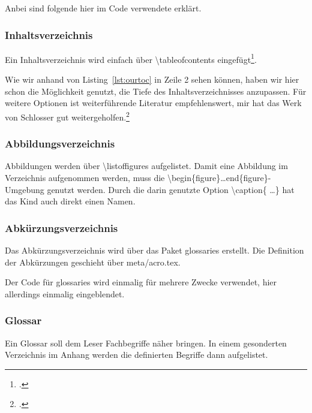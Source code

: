 
Anbei sind folgende hier im Code verwendete erklärt.
\subsubsection{Inhaltsverzeichnis}%
\label{sec:toc}
Ein Inhaltsverzeichnis wird einfach über \textbackslash tableofcontents eingefügt\footcite[Vgl. ][S. 7ff]{ochsner_textverarbeitungssystem_2015}.



Wie wir anhand von Listing~\ref{lst:ourtoc} in Zeile 2 sehen können, haben wir hier schon die Möglichkeit genutzt, die Tiefe des Inhaltsverzeichnisses anzupassen. Für weitere Optionen ist weiterführende Literatur empfehlenswert, mir hat das Werk von Schlosser gut weitergeholfen.\footcite[Vgl. ][S. 207ff.]{schlosser_wissenschaftliche_2014}
\subsubsection{Abbildungsverzeichnis}%
\label{sec:lof}
Abbildungen werden über \textbackslash listoffigures aufgelistet. Damit eine Abbildung im Verzeichnis aufgenommen werden, muss die \textbackslash begin\{figure\}\ldots end\{figure\}-Umgebung genutzt werden. Durch die darin genutzte Option \textbackslash caption\{ \ldots \} hat das Kind auch direkt einen Namen.
\subsubsection{Abkürzungsverzeichnis}%
\label{sec:acros}
Das Abkürzungsverzeichnis wird über das Paket glossaries erstellt. Die Definition der Abkürzungen geschieht über meta/acro.tex.

Der Code für glossaries wird einmalig für mehrere Zwecke verwendet, hier allerdings einmalig eingeblendet.


\subsubsection{Glossar}%
\label{sec:glossaries}
Ein Glossar soll dem Leser Fachbegriffe näher bringen. In einem gesonderten Verzeichnis im Anhang werden die definierten Begriffe dann aufgelistet.

